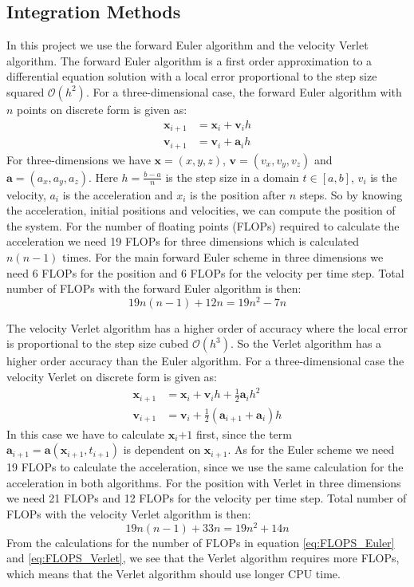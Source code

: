 \documentclass[12pt,a4paper,english]{article}
\begin{document}
\subsection{Integration Methods}
\label{subsect:Integration}
In this project we use the forward Euler algorithm and the velocity Verlet algorithm. The forward Euler algorithm is a first order approximation to a differential equation solution with a local error proportional to the step size squared $\mathcal{O}(h^2)$. For a three-dimensional case, the forward Euler algorithm with $n$ points on discrete form is given as:
\begin{align}
\label{eq:1D_Euler}
\textbf{x}_{i+1}&=\textbf{x}_i+\textbf{v}_ih\\
\textbf{v}_{i+1}&=\textbf{v}_i+\textbf{a}_ih
\end{align}
For three-dimensions we have $\textbf{x}=(x,y,z)$, $\textbf{v}=(v_x,v_y,v_z)$ and $\textbf{a}=(a_x,a_y,a_z)$. Here $h=\frac{b-a}{n}$ is the step size in a domain $t\in[a,b]$, $v_i$ is the velocity, $a_i$ is the acceleration and $x_i$ is the position after $n$ steps. So by knowing the acceleration, initial positions and velocities, we can compute the position of the system. For the number of floating points (FLOPs) required to calculate the acceleration we need 19 FLOPs for three dimensions which is calculated $n(n-1)$ times. For the main forward Euler scheme in three dimensions we need 6 FLOPs for the position and 6 FLOPs for the velocity per time step. Total number of FLOPs with the forward Euler algorithm is then:
\begin{equation}
\label{eq:FLOPS_Euler}
19n(n-1)+12n=19n^2-7n
\end{equation}

The velocity Verlet algorithm has a higher order of accuracy where the local error is proportional to the step size cubed $\mathcal{O}(h^3)$. So the Verlet algorithm has a higher order accuracy than the Euler algorithm. For a three-dimensional case the velocity Verlet on discrete form is given as:
\begin{align}
\label{eq:2D_Verlet}
\textbf{x}_{i+1}&=\textbf{x}_i+\textbf{v}_ih+\frac{1}{2}\textbf{a}_ih^2\\
\textbf{v}_{i+1}&=\textbf{v}_i+\frac{1}{2}(\textbf{a}_{i+1}+\textbf{a}_i)h
\end{align}
In this case we have to calculate $\textbf{x}_i{+1}$ first, since the term $\textbf{a}_{i+1}=\textbf{a}(\textbf{x}_{i+1},t_{i+1})$ is dependent on $\textbf{x}_{i+1}$. As for the Euler scheme we need 19 FLOPs to calculate the acceleration, since we use the same calculation for the acceleration in both algorithms. For the position with Verlet in three dimensions we need 21 FLOPs and 12 FLOPs for the velocity per time step. Total number of FLOPs with the velocity Verlet algorithm is then:
\begin{equation}
\label{eq:FLOPS_Verlet}
19n(n-1)+33n=19n^2+14n
\end{equation}
From the calculations for the number of FLOPs in equation \ref{eq:FLOPS_Euler} and \ref{eq:FLOPS_Verlet}, we see that the Verlet algorithm requires more FLOPs, which means that the Verlet algorithm should use longer CPU time.
\end{document}
